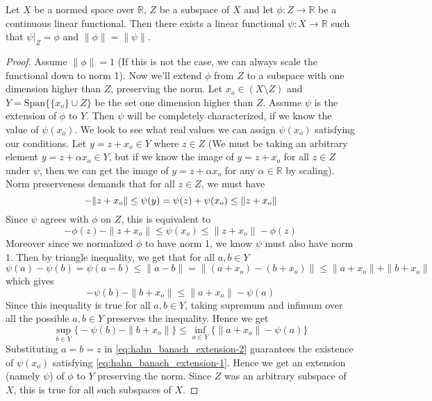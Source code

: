 \begin{theorem}
  Let $X$ be a normed space over $\mathbb{R}$, $Z$ be a subspace of
  $X$ and let $\phi: Z \to  \mathbb{R}$ be a continuous linear
  functional. Then there exists a linear functional $\psi: X \to
  \mathbb{R}$ such that $\psi|_Z = \phi$ and $\|\phi\| = \|\psi\|$.
  \label{thm:hahn-banach-extension}
\end{theorem}
\begin{proof}
  Assume $\|\phi\| = 1$ (If this is not the case, we can always scale
  the functional down to norm 1). Now we'll extend $\phi$ from $Z$ to
  a subspace with one dimension higher than $Z$, preserving the norm.
  Let $x_o \in (X \setminus Z)$ and $Y = \textrm{Span}\{ \{ x_o \}
  \cup Z \}$ be the set one dimension higher than $Z$. Assume $ \psi$
  is the extension of $\phi$ to $Y$. Then $\psi$ will be completely
  characterized, if we know the value of $\psi(x_o)$. We look to see
  what real values we can assign $\psi(x_o)$ satisfying our
  conditions. Let $y = z +  x_o \in Y$ where $z \in Z$ (We must be
    taking an arbitrary element $y = z + \alpha x_o \in Y$, but if we
    know the image of $y = z + x_o$ for all $z \in Z$ under $\psi$,
    then we can get the image of $y = z + \alpha x_o$ for any $ \alpha
  \in \mathbb{R}$ by scaling). Norm preserveness demands that for all
  $z \in Z$, we must have \[
    -\|z +  x_o\| \le \psi(y) = \psi(z) + \psi(x_o) \le \|z + x_o\| \\
  \]
  Since $\psi$ agrees with $\phi$ on $Z$, this is equivalent to
  \begin{equation}
    \label{eq:hahn_banach_extension-1}
    -\phi(z) - \|z + x_o\| \le \psi(x_o) \le \|z + x_o\| - \phi(z)
  \end{equation}
  Moreover since we normalized $\phi$ to have norm 1, we know $\psi$
  must also have norm 1. Then by triangle inequality, we get that for
  all $ a, b \in Y$ \[
    \psi(a) - \psi(b)  = \psi(a - b) \le \| a - b\| = \|(a+x_o) - ( b
    + x_o)\| \le \|a + x_o\| + \|b+x_o\|
  \]
  which gives \[
    - \psi(b) - \|b + x_o\| \le \|a + x_o\| - \psi(a)
  \]
  Since this inequality is true for all $a, b \in Y$, taking supremum
  and infimum over all the possible $ a, b \in Y$ preserves the
  inequality. Hence we get
  \begin{equation}
    \label{eq:hahn_banach_extension-2}
    \sup_{b \in Y} \Big \{- \psi(b) - \|b + x_o\|\Big \} \le \inf_{a
    \in Y} \Big\{ \|a + x_o\| - \psi(a) \Big \}
  \end{equation}
  Substituting $a = b = z$ in \autoref{eq:hahn_banach_extension-2}
  guarantees the existence of $\psi(x_o)$ satisfying
  \autoref{eq:hahn_banach_extension-1}. Hence we get an extension
  (namely $\psi$) of $\phi$ to $Y$ preserving the norm. Since $Z$ was
  an arbitrary subspace of $X$, this is true for all such subspaces of $X$.


\end{proof}
